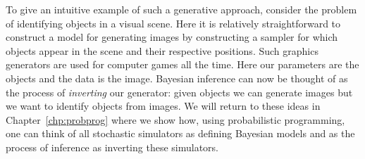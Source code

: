 To give an intuitive example of such a generative approach, consider the problem of identifying objects in
a visual scene.  Here it is relatively straightforward to construct a model for generating images by
constructing a sampler for which objects appear in the scene and their respective positions.  Such
graphics generators are used for computer games all the time.  Here our parameters are the objects and
the data is the image.  Bayesian inference can now be thought of as the process of \emph{inverting} our generator:
given objects we can generate images but we want to identify objects from images.  We will return
to these ideas in Chapter~\ref{chp:probprog} where we show how, using probabilistic programming,
one can think of all stochastic simulators as defining Bayesian models and as the process of inference as
inverting these simulators.